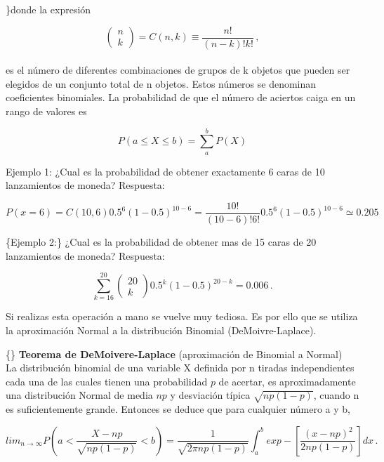 \documentclass[
]{agujournal2019}
\begin{document}
\noindent\}donde la expresión

\[\left( \begin{array}{c}
 n \\ k
       \end{array} \right)=C(n,k)\equiv\frac{n!}{(n-k)!k!}\,,\]\\

es el número de diferentes combinaciones de grupos de k objetos que
pueden ser elegidos de un conjunto total de n objetos. Estos números se
denominan coeficientes binomiales. La probabilidad de que el número de
aciertos caiga en un rango de valores es

\[P(a\le X\le b)=\sum^b_a P(X)\]

\vspace{0.5cm}

Ejemplo 1: ¿Cual es la probabilidad de obtener exactamente 6 caras de 10
lanzamientos de moneda? Respuesta:

\[P(x=6) = C(10,6)0.5^6(1-0.5)^{10-6} = \frac{10!}{(10-6)!6!}0.5^6(1-0.5)^{10-6} \simeq 0.205\]

\vspace{0.5cm}

\{\noindent  Ejemplo 2:\} ¿Cual es la probabilidad de obtener mas de 15
caras de 20 lanzamientos de moneda? Respuesta:

\[\sum^{20}_{k=16} \left( \begin{array}{c} 20 \\ k
       \end{array} \right) 0.5^k(1-0.5)^{20-k}=0.006\,.\]

Si realizas esta operación a mano se vuelve muy tediosa. Es por ello que
se utiliza la aproximación Normal a la distribución Binomial
(DeMoivre-Laplace).

\vspace{0.5cm}

\{\noindent\} \textbf{Teorema de DeMoivere-Laplace} (aproximación de
Binomial a Normal)\\

La distribución binomial de una variable X definida por n tiradas
independientes cada una de las cuales tienen una probabilidad \(p\) de
acertar, es aproximadamente una distribución Normal de media \(np\) y
desviación típica \(\sqrt{np(1-p)}\), cuando n es suficientemente
grande. Entonces se deduce que para cualquier número a y b,

\[lim_{n\rightarrow\infty} P \left( a<\frac{X-np}{\sqrt{np(1-p)}}<b\right)= \frac{1}{\sqrt{2\pi np(1-p)}}\int^b_a exp-\left[\frac{(x-np)^2}{2np(1-p)}\right]dx\,.\]\\
\end{document}
